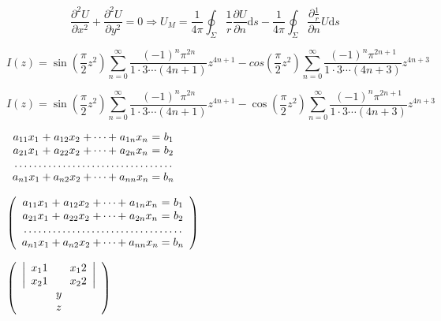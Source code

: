 \documentclass{article}
\begin{document}
    \begin{equation}
        \frac{\partial^2U}{\partial x^2} + \frac{\partial^2U}{\partial y^2}=0 \Longrightarrow U_M = \frac{1}{4\pi} \oint_\Sigma \frac{1}{r} \frac{\partial U}{\partial n}\mathrm{d}s - \frac{1}{4\pi}\oint_\Sigma \frac{\partial \frac{1}{r}}{\partial n}U\mathrm{d}s
    \end{equation}

    \begin{equation}
        I(z)=\sin(\frac{\pi}{2} z^2)\sum_{n=0}^\infty \frac{(-1)^n \pi^{2n}}{1 \cdot 3 \cdots(4n +1)} z^{4n+1} - cos(\frac{\pi}{2} z^2) \sum_{n=0}^\infty \frac{(-1)^n \pi^{2n+1}}{1\cdot3\cdots(4n+3)} z^{4n+3}
    \end{equation}


    \begin{equation}
        I(z)=\sin\left(\frac{\pi}{2} z^2\right)\sum_{n=0}^\infty \frac{(-1)^n \pi^{2n}}{1 \cdot 3 \cdots(4n +1)} z^{4n+1} - \cos\left(\frac{\pi}{2} z^2\right) \sum_{n=0}^\infty \frac{(-1)^n \pi^{2n+1}}{1\cdot3\cdots(4n+3)} z^{4n+3}
    \end{equation}

    \begin{math}
        \begin{array}{c@{\:+\:}c@{\:+\cdots+\:}c@{\;=\;}c}
            a_{11}x_1 & a_{12}x_2 & a_{1n}x_n & b_1 \\
            a_{21}x_1 & a_{22}x_2 & a_{2n}x_n & b_2 \\
            \multicolumn{4}{c}{\dotfill} \\
            a_{n1}x_1 & a_{n2}x_2 & a_{nn}x_n & b_n \\
        \end{array}
    \end{math}

    \begin{math}
        \left (
        \begin{array}{c@{\:+\:}c@{\:+\cdots+\:}c@{\;=\;}c}
            a_{11}x_1 & a_{12}x_2 & a_{1n}x_n & b_1 \\
            a_{21}x_1 & a_{22}x_2 & a_{2n}x_n & b_2 \\
            \multicolumn{4}{c}{\dotfill} \\
            a_{n1}x_1 & a_{n2}x_2 & a_{nn}x_n & b_n \\
        \end{array}
        \right )
    \end{math}

    \begin{math}
        \left (
        \begin{array}{c}
            \left |
                \begin{array}{c@{\qquad}c}
                    x_11 & x_12 \\
                    x_21 & x_22 \\
                \end{array}
            \right | \\
            y \\
            z \\
        \end{array}
        \right )
    \end{math}
\end{document}
